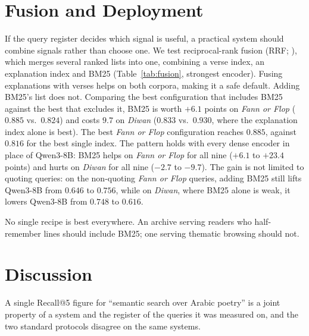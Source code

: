 \documentclass[11pt]{article}
\begin{document}


\section{Fusion and Deployment}
\label{sec:recipe}

If the query register decides which signal is useful, a practical system should combine signals rather than choose one. We test reciprocal-rank fusion (RRF; \citealp{cormack2009rrf}), which merges several ranked lists into one, combining a verse index, an explanation index and BM25 (Table~\ref{tab:fusion}, strongest encoder). Fusing explanations with verses helps on both corpora, making it a safe default. Adding BM25's list does not. Comparing the best configuration that includes BM25 against the best that excludes it, BM25 is worth $+6.1$ points on \textit{Fann or Flop} ($0.885$ vs.\ $0.824$) and costs $9.7$ on \textit{Diwan} ($0.833$ vs.\ $0.930$, where the explanation index alone is best). The best \textit{Fann or Flop} configuration reaches $0.885$, against $0.816$ for the best single index. The pattern holds with every dense encoder in place of Qwen3-8B: BM25 helps on \textit{Fann or Flop} for all nine ($+6.1$ to $+23.4$ points) and hurts on \textit{Diwan} for all nine ($-2.7$ to $-9.7$). The gain is not limited to quoting queries: on the non-quoting \textit{Fann or Flop} queries, adding BM25 still lifts Qwen3-8B from $0.646$ to $0.756$, while on \textit{Diwan}, where BM25 alone is weak, it lowers Qwen3-8B from $0.748$ to $0.616$.

No single recipe is best everywhere. An archive serving readers who half-remember lines should include BM25; one serving thematic browsing should not.

\begin{table}[t]
\centering\small
\setlength{\tabcolsep}{3.5pt}

\caption{Reciprocal-rank fusion over index configurations, Qwen3-8B. $\oplus$ denotes RRF ($k{=}60$). Fusing explanations helps on both corpora; adding BM25 helps only where queries carry remembered wording.}
\label{tab:fusion}
\end{table}

\section{Discussion}
\label{sec:discussion}

A single Recall@5 figure for ``semantic search over Arabic poetry'' is a joint property of a system and the register of the queries it was measured on, and the two standard protocols disagree on the same systems.
\end{document}
